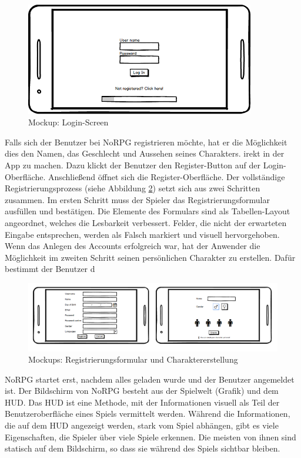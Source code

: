 			\begin{figure}[htbp]
				\centering 
				\label{mockupLogin}
				\includegraphics[width=10cm]{pics/Login.png}
				\caption{Mockup: Login-Screen}
			\end{figure}
			
			Falls sich der Benutzer bei NoRPG registrieren möchte, hat er die Möglichkeit dies den Namen, das Geschlecht und Aussehen seines Charakters.
			irekt in der App zu machen. Dazu klickt der Benutzer den Register-Button auf der Login-Oberfläche. Anschließend öffnet sich die Register-Oberfläche. Der vollständige Registrierungsprozess (siehe Abbildung \ref{mockupsRegistrierung}) setzt sich aus zwei Schritten zusammen. Im ersten Schritt muss der Spieler das Registrierungsformular ausfüllen und bestätigen. Die Elemente des Formulars sind als Tabellen-Layout angeordnet, welches die Lesbarkeit verbessert. Felder, die nicht der erwarteten Eingabe entsprechen, werden als Falsch markiert und visuell hervorgehoben. Wenn das Anlegen des Accounts erfolgreich war, hat der Anwender die Möglichkeit im zweiten Schritt seinen persönlichen Charakter zu erstellen. Dafür bestimmt der Benutzer d
			\begin{figure}[htbp]
				\centering 
				\label{mockupsRegistrierung}
				\includegraphics[width=\textwidth]{pics/Registerprozess.png}
				\caption{Mockups: Registrierungsformular und Charaktererstellung}
			\end{figure}
		
			NoRPG startet erst, nachdem alles geladen wurde und der Benutzer angemeldet ist. Der Bildschirm von NoRPG besteht aus der Spielwelt (Grafik) und dem \ac{HUD}. Das \ac{HUD} ist eine Methode, mit der Informationen visuell als Teil der Benutzeroberfläche eines Spiels vermittelt werden. Während die Informationen, die auf dem \ac{HUD} angezeigt werden, stark vom Spiel abhängen, gibt es viele Eigenschaften, die Spieler über viele Spiele erkennen. Die meisten von ihnen sind statisch auf dem Bildschirm, so dass sie während des Spiels sichtbar bleiben.  
			

